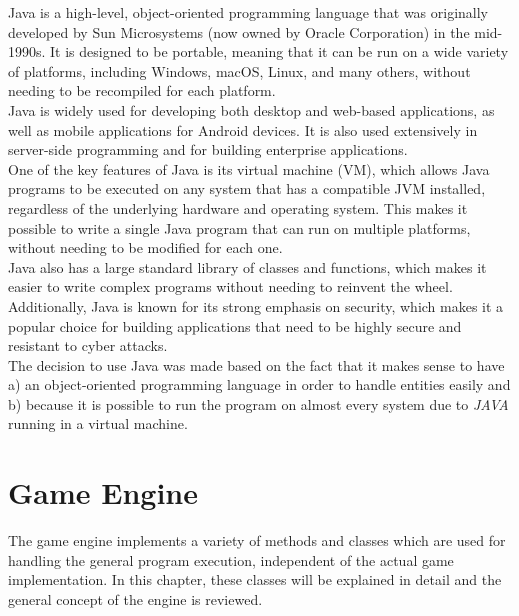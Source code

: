 Java is a high-level, object-oriented programming language that was originally developed by Sun Microsystems (now owned by Oracle Corporation) in the mid-1990s.
It is designed to be portable, meaning that it can be run on a wide variety of platforms, including Windows, macOS, Linux, and many others, without needing to be recompiled for each platform.
\\
Java is widely used for developing both desktop and web-based applications, as well as mobile applications for Android devices.
It is also used extensively in server-side programming and for building enterprise applications.
\\
One of the key features of Java is its virtual machine (VM), which allows Java programs to be executed on any system that has a compatible JVM installed, regardless of the underlying hardware and operating system.
This makes it possible to write a single Java program that can run on multiple platforms, without needing to be modified for each one.
\\
Java also has a large standard library of classes and functions, which makes it easier to write complex programs without needing to reinvent the wheel.
Additionally, Java is known for its strong emphasis on security, which makes it a popular choice for building applications that need to be highly secure and resistant to cyber attacks.
\\
The decision to use Java was made based on the fact that it makes sense to have a) an object-oriented programming language in order to
handle entities easily and b) because it is possible to run the program on almost every system due to \textit{JAVA} running
in a virtual machine.

\section{Game Engine}\label{sec:game}
The game engine implements a variety of methods and classes which are used for handling the general program execution, independent of the actual game implementation.
In this chapter, these classes will be explained in detail and the general concept of the engine is reviewed.

